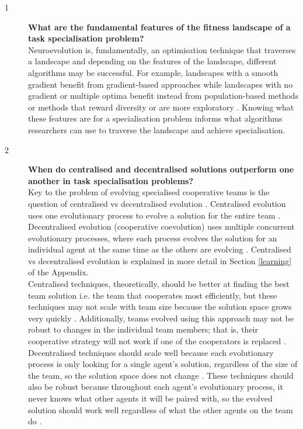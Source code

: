 \documentclass[12pt]{article}
\begin{document}
\begin{description}
\item[1] \textbf{What are the fundamental features of the fitness landscape of a task specialisation problem?}\\

Neuroevolution is, fundamentally, an optimisation technique that traverses a landscape and depending on the features of the landscape, different algorithms may be successful.
For example, landscapes with a smooth gradient benefit from gradient-based approaches while landscapes with no gradient or multiple optima benefit instead from population-based methods or methods that reward diversity or are more exploratory \cite{oller:AAMAS:2020}.
Knowing what these features are for a specialisation problem informs what algorithms researchers can use to traverse the landscape and achieve specialisation.

\item[2] \textbf{When do centralised and decentralised solutions outperform one another in task specialisation problems?}\\

Key to the problem of evolving specialised cooperative teams is the question of centralised vs decentralised evolution \cite{panait:AAMAS:2005}.
Centralised evolution uses one evolutionary process to evolve a solution for the entire team \cite{panait:AAMAS:2005}.
Decentralised evolution (cooperative coevolution) uses multiple concurrent evolutionary processes, where each process evolves the solution for an individual agent at the same time as the others are evolving \cite{panait:AAMAS:2005}.
Centralised vs decentralised evolution is explained in more detail in Section \ref{learning} of the Appendix.\\

Centralised techniques, theoretically, should be better at finding the best team solution i.e. the team that cooperates most efficiently, but these techniques may not scale with team size because the solution space grows very quickly \cite{panait:AAMAS:2005}.
Additionally, teams evolved using this approach may not be robust to changes in the individual team members; that is, their cooperative strategy will not work if one of the cooperators is replaced \cite{panait:AAMAS:2005}.\\

Decentralised techniques should scale well because each evolutionary process is only looking for a single agent's solution, regardless of the size of the team, so the solution space does not change \cite{panait:AAMAS:2005}.
These techniques should also be robust because throughout each agent's evolutionary process, it never knows what other agents it will be paired with, so the evolved solution should work well regardless of what the other agents on the team do \cite{panait:AAMAS:2005}.\\


\end{description}
\end{document}
